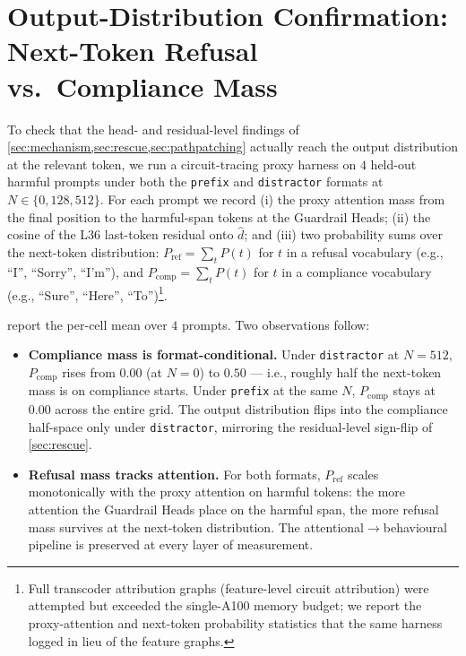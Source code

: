 \documentclass[10pt,twocolumn]{article}
\newcommand{\dhat}{\hat{d}}
\newcommand{\Ncontext}{N}
\theoremstyle{definition}
\begin{document}
\section{Output-Distribution Confirmation: Next-Token Refusal vs.\ Compliance Mass}
\label{sec:circuit-tracing}

To check that the head- and residual-level findings of
\cref{sec:mechanism,sec:rescue,sec:pathpatching} actually reach the
output distribution at the relevant token, we run a circuit-tracing
proxy harness on $4$ held-out harmful prompts under both the
\texttt{prefix} and \texttt{distractor} formats at $\Ncontext \in
\{0, 128, 512\}$. For each prompt we record (i) the proxy attention
mass from the final position to the harmful-span tokens at the
Guardrail Heads; (ii) the cosine of the L36 last-token residual onto
$\dhat$; and (iii) two probability sums over the next-token
distribution: $P_{\mathrm{ref}} = \sum_t P(t)$ for $t$ in a refusal
vocabulary (e.g., ``I'', ``Sorry'', ``I'm''), and
$P_{\mathrm{comp}} = \sum_t P(t)$ for $t$ in a compliance vocabulary
(e.g., ``Sure'', ``Here'', ``To'')\footnote{Full transcoder
attribution graphs (feature-level circuit attribution) were attempted
but exceeded the single-A100 memory budget; we report the
proxy-attention and next-token probability statistics that the same
harness logged in lieu of the feature graphs.}.

 report the per-cell mean over $4$ prompts.
Two observations follow:

\begin{itemize}[leftmargin=*, itemsep=2pt]
  \item \textbf{Compliance mass is format-conditional.} Under
        \texttt{distractor} at $\Ncontext{=}512$, $P_{\mathrm{comp}}$
        rises from $0.00$ (at $\Ncontext{=}0$) to $0.50$ --- i.e.,
        roughly half the next-token mass is on compliance starts.
        Under \texttt{prefix} at the same $\Ncontext$, $P_{\mathrm{comp}}$
        stays at $0.00$ across the entire grid. The output
        distribution flips into the compliance half-space only under
        \texttt{distractor}, mirroring the residual-level sign-flip
        of \cref{sec:rescue}.
  \item \textbf{Refusal mass tracks attention.} For both formats,
        $P_{\mathrm{ref}}$ scales monotonically with the proxy
        attention on harmful tokens: the more attention the
        Guardrail Heads place on the harmful span, the more refusal
        mass survives at the next-token distribution. The
        attentional$\to$behavioural pipeline is preserved at every
        layer of measurement.
\end{itemize}
\end{document}
